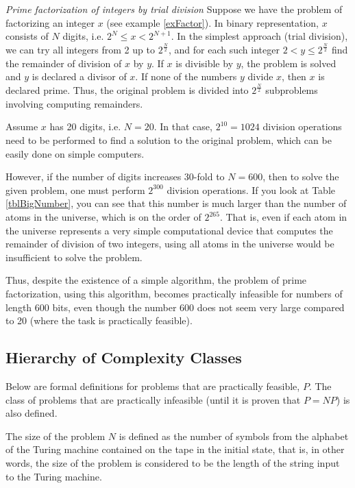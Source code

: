 \begin{example}
\emph{Prime factorization of integers by trial division}
\label{exAddAlgoTrialDivision}
Suppose we have the problem of factorizing an integer $x$
(see example \ref{exFactor}). 
In binary representation, $x$ consists of $N$ digits, i.e. 
$2^N \le x < 2^{N+1}$. In the simplest approach (trial division), we
can try all integers from 2 up to $2^{\frac{N}{2}}$, and for
each such integer $2 < y \le 2^{\frac{N}{2}}$ find the remainder of
division of $x$ by $y$. If $x$ is divisible by $y$, the problem is solved and $y$
is declared a divisor of $x$. If none of the numbers $y$ divide
$x$, then $x$ is declared prime.
Thus, the original problem is divided into $2^{\frac{N}{2}}$ subproblems involving computing
remainders.

Assume $x$ has 20 digits, i.e. $N=20$. In that case,
$2^{10} = 1024$ division operations need to be performed to find
a solution to the original problem, which can be easily done on simple
computers. 

However, if the number of digits increases 30-fold to $N=600$, then to
solve the given problem, one must perform $2^{300}$ division operations. If you look at Table \ref{tblBigNumber}, you can see
that this number is much larger than the number of atoms in the universe,
which is on the order of $2^{265}$. That is, even if each atom in the universe represents
a very simple computational device that computes the remainder of division of two integers,
using all atoms in the universe would be insufficient to solve the problem.

Thus, despite the existence of a simple algorithm, the problem of prime factorization,
using this algorithm, becomes practically infeasible for numbers of length 600 bits,
even though the number 600 does not seem very large compared to 20 (where the task is practically feasible).
\end{example}


\subsection{Hierarchy of Complexity Classes}

Below are formal definitions for problems that are
practically feasible, $P$. The class of problems that are
practically infeasible (until it is proven that
$P = NP$) is also defined.

\begin{definition}
The size of the problem $N$ is defined as the number of symbols from the alphabet of the Turing machine
contained on the tape in the initial state, that is, in other
words, the size of the problem is considered to be the length of the string input to the Turing machine.
\end{definition}

